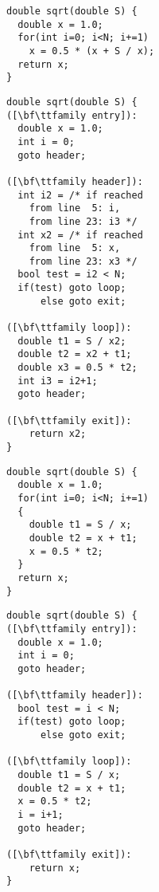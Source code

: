 \begin{minipage}{0.48\textwidth}
\begin{lstlisting}[language=MyCpp,captionpos=t,title=
   {{\bf(a)} {} C source function:\leftskip=0pt}]
double sqrt(double S) {
  double x = 1.0;
  for(int i=0; i<N; i+=1)
    x = 0.5 * (x + S / x);
  return x;
}
\end{lstlisting}
\begin{lstlisting}[language=MyCpp,captionpos=t,title=
   {{\bf(d)} {} The SSA property is introduced:\leftskip=0pt}]
double sqrt(double S) {
([\bf\ttfamily entry]):
  double x = 1.0;
  int i = 0;
  goto header;

([\bf\ttfamily header]):
  int i2 = /* if reached
    from line  5: i,
    from line 23: i3 */
  int x2 = /* if reached
    from line  5: x,
    from line 23: x3 */
  bool test = i2 < N;
  if(test) goto loop;
      else goto exit;

([\bf\ttfamily loop]):
  double t1 = S / x2;
  double t2 = x2 + t1;
  double x3 = 0.5 * t2;
  int i3 = i2+1;
  goto header;

([\bf\ttfamily exit]):
    return x2;
}
\end{lstlisting}
\end{minipage}
\hfill
\begin{minipage}{0.48\textwidth}
\begin{lstlisting}[language=MyCpp,basicstyle=\linespread{1.06451612903}\ttfamily,
                   captionpos=t,title=
   {{\bf(b)} {} Complex expressions are broken down:\leftskip=0pt}]
double sqrt(double S) {
  double x = 1.0;
  for(int i=0; i<N; i+=1)
  {
    double t1 = S / x;
    double t2 = x + t1;
    x = 0.5 * t2;
  }
  return x;
}
\end{lstlisting}
\begin{lstlisting}[language=MyCpp,basicstyle=\linespread{1.06451612903}\ttfamily,
                   captionpos=t,title=
   {{\bf(c)} {} Structured control flow is expanded:\leftskip=0pt}]
double sqrt(double S) {
([\bf\ttfamily entry]):
  double x = 1.0;
  int i = 0;
  goto header;

([\bf\ttfamily header]):
  bool test = i < N;
  if(test) goto loop;
      else goto exit;

([\bf\ttfamily loop]):
  double t1 = S / x;
  double t2 = x + t1;
  x = 0.5 * t2;
  i = i+1;
  goto header;

([\bf\ttfamily exit]):
    return x;
}
\end{lstlisting}
\end{minipage}
